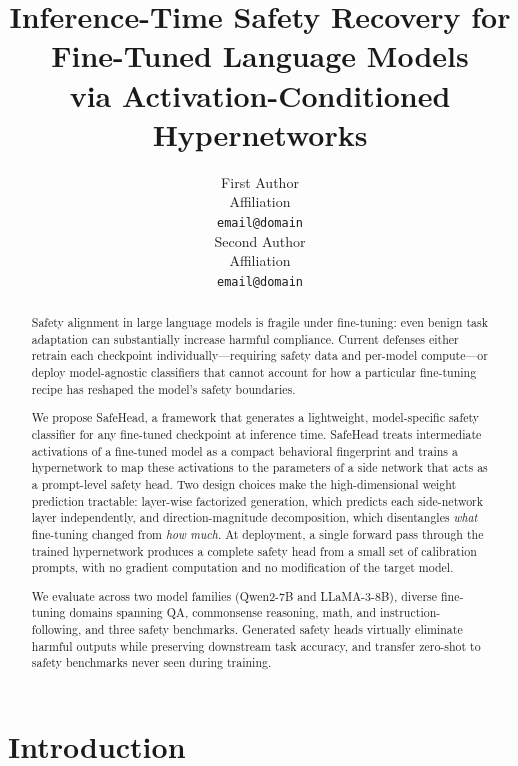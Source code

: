\documentclass[11pt]{article}
\title{Inference-Time Safety Recovery for Fine-Tuned Language Models \\via Activation-Conditioned Hypernetworks}
\author{First Author \\
  Affiliation \\
  \texttt{email@domain} \\\And
  Second Author \\
  Affiliation \\
  \texttt{email@domain} \\}
\newcommand{\method}{SafeHead}
\begin{document}
\maketitle

\begin{abstract}
Safety alignment in large language models is fragile under fine-tuning: even benign task adaptation can substantially increase harmful compliance. Current defenses either retrain each checkpoint individually---requiring safety data and per-model compute---or deploy model-agnostic classifiers that cannot account for how a particular fine-tuning recipe has reshaped the model's safety boundaries.

We propose \method{}, a framework that generates a lightweight, model-specific safety classifier for any fine-tuned checkpoint at inference time. \method{} treats intermediate activations of a fine-tuned model as a compact behavioral fingerprint and trains a hypernetwork to map these activations to the parameters of a side network that acts as a prompt-level safety head. Two design choices make the high-dimensional weight prediction tractable: layer-wise factorized generation, which predicts each side-network layer independently, and direction-magnitude decomposition, which disentangles \textit{what} fine-tuning changed from \textit{how much}. At deployment, a single forward pass through the trained hypernetwork produces a complete safety head from a small set of calibration prompts, with no gradient computation and no modification of the target model.

We evaluate across two model families (Qwen2-7B and LLaMA-3-8B), diverse fine-tuning domains spanning QA, commonsense reasoning, math, and instruction-following, and three safety benchmarks. Generated safety heads virtually eliminate harmful outputs while preserving downstream task accuracy, and transfer zero-shot to safety benchmarks never seen during training.
\end{abstract}

\section{Introduction}
\label{sec:intro}
\end{document}
